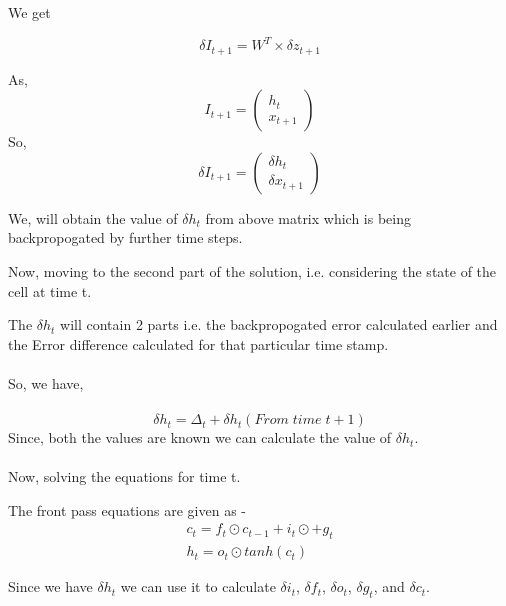 We get 

\begin{equation}
    \delta I_{t+1} = W^T \times \delta z_{t+1}
\end{equation}

As, 
\begin{equation}
    I_{t+1} = \begin{pmatrix}  h_t \\ x_{t+1} \end{pmatrix}
\end{equation}
So, 
\begin{equation}
   \delta I_{t+1} = \begin{pmatrix} \delta h_t \\ \delta x_{t+1} \end{pmatrix}
\end{equation}

We, will obtain the value of $ \delta h_t $ from above matrix which is being backpropogated by further time steps.

Now, moving to the second part of the solution, i.e. considering the state of the cell at time t.

The $ \delta h_t $ will contain 2 parts i.e. the backpropogated error calculated earlier and the Error difference calculated for that particular time stamp. 
\\ \\ 
So, we have, 
\\ \\ 
\begin{equation}
    \delta h_t = \Delta_t + \delta h_t(From \; time \; t+1) 
\end{equation}
Since, both the values are known we can calculate the value of $\delta h_t$. 
\\ \\ 

Now, solving the equations for time t. 

The front pass equations are given as - 
\begin{equation}
\begin{gathered}
c_t = f_t \odot c_{t-1} + i_t \odot + g_t \\
h_t = o_t \odot tanh(c_t) 
\end{gathered}
\end{equation}

Since we have $\delta h_t$ we can use it to calculate $ \delta i_{t} $, $ \delta f_{t} $, $ \delta o_{t} $, $ \delta g_{t} $, and $ \delta c_{t} $. 
\\ \\

